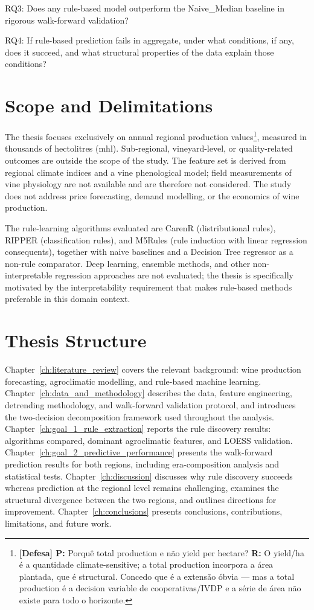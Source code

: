 \textbullet{}  RQ3: Does any rule-based model outperform the Naive\_Median baseline in rigorous walk-forward validation?

\textbullet{}  RQ4: If rule-based prediction fails in aggregate, under what conditions, if any, does it succeed, and what structural properties of the data explain those conditions?


\section{Scope and Delimitations}\label{sec:scope_and_delimitations}

The thesis focuses exclusively on annual regional production values\footnote{\textbf{[Defesa] P:} Porquê total production e não yield per hectare? \textbf{R:} O yield/ha é a quantidade climate-sensitive; a total production incorpora a área plantada, que é structural. Concedo que é a extensão óbvia --- mas a total production é a decision variable de cooperativas/IVDP e a série de área não existe para todo o horizonte.}, measured in thousands of hectolitres (mhl). Sub-regional, vineyard-level, or quality-related outcomes are outside the scope of the study. The feature set is derived from regional climate indices and a vine phenological model; field measurements of vine physiology are not available and are therefore not considered. The study does not address price forecasting, demand modelling, or the economics of wine production.

The rule-learning algorithms evaluated are CarenR (distributional rules), RIPPER (classification rules), and M5Rules (rule induction with linear regression consequents), together with naive baselines and a Decision Tree regressor as a non-rule comparator. Deep learning, ensemble methods, and other non-interpretable regression approaches are not evaluated; the thesis is specifically motivated by the interpretability requirement that makes rule-based methods preferable in this domain context.


\section{Thesis Structure}\label{sec:thesis_structure}

Chapter~\ref{ch:literature_review} covers the relevant background: wine production forecasting, agroclimatic modelling, and rule-based machine learning. Chapter~\ref{ch:data_and_methodology} describes the data, feature engineering, detrending methodology, and walk-forward validation protocol, and introduces the two-decision decomposition framework used throughout the analysis. Chapter~\ref{ch:goal_1_rule_extraction} reports the rule discovery results: algorithms compared, dominant agroclimatic features, and LOESS validation. Chapter~\ref{ch:goal_2_predictive_performance} presents the walk-forward prediction results for both regions, including era-composition analysis and statistical tests. Chapter~\ref{ch:discussion} discusses why rule discovery succeeds whereas prediction at the regional level remains challenging, examines the structural divergence between the two regions, and outlines directions for improvement. Chapter~\ref{ch:conclusions} presents conclusions, contributions, limitations, and future work.
